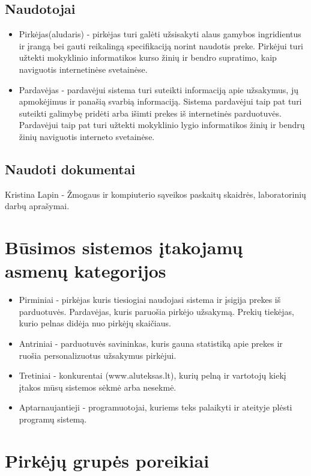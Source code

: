 \documentclass[oneside]{VUMIFPSkursinis}
\begin{document}
	\subsection{Naudotojai}
		\begin{itemize}
			\item{Pirkėjas(aludaris) - pirkėjas turi galėti užsisakyti alaus gamybos ingridientus ir įrangą bei gauti reikalingą specifikaciją norint naudotis preke.
				Pirkėjui turi užtekti mokyklinio informatikos kurso žinių ir bendro supratimo, kaip naviguotis internetinėse svetainėse.}
			\item{Pardavėjas - pardavėjui sistema turi suteikti informaciją apie užsakymus, jų apmokėjimus ir panašią svarbią informaciją.
				Sistema pardavėjui taip pat turi suteikti galimybę pridėti arba išimti prekes iš internetinės parduotuvės.
				Pardavėjui taip pat turi užtekti mokyklinio lygio informatikos žinių ir bendrų žinių naviguotis interneto svetainėse.}
		\end{itemize}
	\subsection{Naudoti dokumentai}
		Kristina Lapin - Žmogaus ir kompiuterio sąveikos paskaitų skaidrės, laboratorinių darbų aprašymai.

\section{Būsimos sistemos įtakojamų asmenų kategorijos}
	\begin{itemize}
		\item{Pirminiai - pirkėjas kuris tiesiogiai naudojasi sistema ir įsigija prekes iš parduotuvės.
			Pardavėjas, kuris paruošia pirkėjo užsakymą.
			Prekių tiekėjas, kurio pelnas didėja nuo pirkėjų skaičiaus.}
		\item{Antriniai - parduotuvės savininkas, kuris gauna statistiką apie prekes ir ruošia personalizuotus užsakymus pirkėjui.}
		\item{Tretiniai - konkurentai (www.aluteksas.lt), kurių pelną ir vartotojų kiekį įtakos mūsų sistemos sėkmė arba nesekmė. }
		\item{Aptarnaujantieji - programuotojai, kuriems teks palaikyti ir ateityje plėsti programų sistemą.}
	\end{itemize}

\section{Pirkėjų grupės poreikiai}
\end{document}
